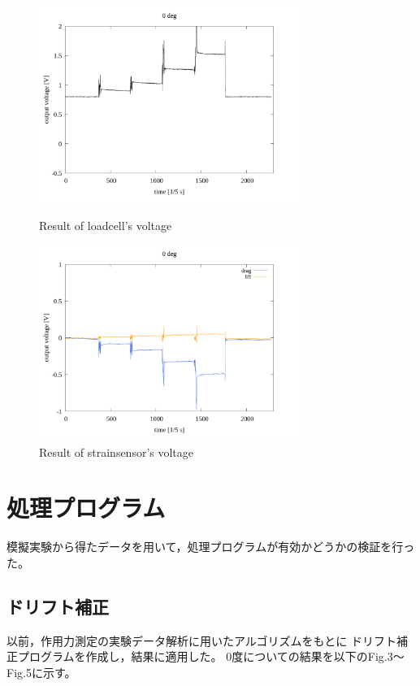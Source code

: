 \documentclass[twocolumn,a4j]{jsarticle}
\begin{document}
\begin{figure}[htbp]
    \footnotesize
    \begin{center}
        \includegraphics[width=85mm]{../images/voltage-time/0_loadcell.png}
        \caption{Result of loadcell's voltage}
        \includegraphics[width=85mm]{../images/voltage-time/0_strainsensor.png}
        \caption{Result of strainsensor's voltage}
    \end{center}
\end{figure}

\section{処理プログラム}
模擬実験から得たデータを用いて，処理プログラムが有効かどうかの検証を行った。

\subsection{ドリフト補正}
以前，作用力測定の実験データ解析に用いたアルゴリズムをもとに
ドリフト補正プログラムを作成し，結果に適用した。
0度についての結果を以下のFig.3～Fig.5に示す。
\end{document}
